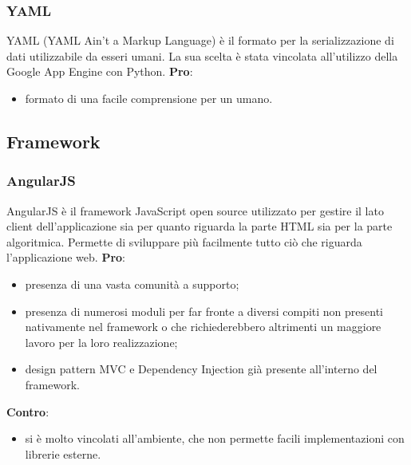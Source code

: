 		\subsubsection{YAML} %
		\label{ssub:yaml}
		YAML (YAML Ain't a Markup Language) è il formato per la serializzazione di dati utilizzabile da esseri umani. \newline
		La sua scelta è stata vincolata all'utilizzo della Google App Engine con Python. \newline
		\textbf{Pro}:
			\begin{itemize}
				\item formato di una facile comprensione per un umano.
			\end{itemize}
		\noindent


	\subsection{Framework} %
	\label{sub:framework}
		\subsubsection{AngularJS} %
		\label{ssub:angularjs}
		AngularJS è il framework JavaScript open source utilizzato per gestire il lato client dell'applicazione sia per quanto riguarda la parte HTML sia per la parte algoritmica. Permette di sviluppare più facilmente tutto ciò che riguarda l'applicazione web. \newline
		\textbf{Pro}:
			\begin{itemize}
				\item presenza di una vasta comunità a supporto;
				\item presenza di numerosi moduli per far fronte a diversi compiti non presenti nativamente nel framework o che richiederebbero altrimenti un maggiore lavoro per la loro realizzazione;
				\item design pattern MVC e Dependency Injection già presente all'interno del framework.
			\end{itemize}
		\noindent
		\textbf{Contro}:
			\begin{itemize}
				\item si è molto vincolati all'ambiente, che non permette facili implementazioni con librerie esterne.
			\end{itemize}

